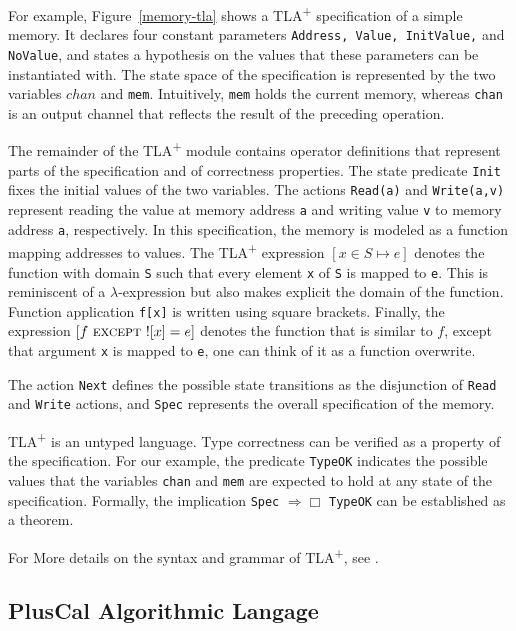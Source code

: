 \documentclass[journal]{IEEEtran}
\newcommand{\tlaplus}{TLA\textsuperscript{+}\xspace}
\newcommand{\EXCEPT}{\textsc{except}}
\begin{document}
For example, Figure~\ref{memory-tla} shows a \tlaplus specification of a simple memory. It declares four constant parameters \verb|Address, Value, InitValue,| and \verb|NoValue|, and states a hypothesis on the values that these parameters can be instantiated with. The state space of the specification is represented by the two variables $chan$ and \verb|mem|. Intuitively, \verb|mem| holds the current memory, whereas \verb|chan| is an output channel that reflects the result of the preceding operation.

The remainder of the \tlaplus module contains operator definitions that represent parts of the specification and of correctness properties. The state predicate \verb|Init| fixes the initial values of the two variables. The actions \verb|Read(a)| and \verb|Write(a,v)| represent reading the value at memory address \verb|a| and writing value \verb|v| to memory address \verb|a|, respectively. In this specification, the memory is modeled as a function mapping addresses to values. The \tlaplus expression $[x \in S \mapsto e]$ denotes the function with domain \verb|S| such that every element \verb|x| of \verb|S| is mapped to \verb|e|. This is reminiscent of a $\lambda$-expression but also makes explicit the domain of the function. Function application \verb|f[x]| is written using square brackets. Finally, the expression $[f\ \EXCEPT\ ![x] = e]$ denotes the function that is similar to $f$, except that argument \verb|x| is mapped to \verb|e|, one can think of it as a function overwrite.

The action \verb|Next| defines the possible state transitions as the disjunction of \verb|Read| and \verb|Write| actions, and \verb|Spec| represents the overall specification of the memory.

\tlaplus is an untyped language. Type correctness can be verified as a property of the specification. For our example, the predicate \verb|TypeOK| indicates the possible values that the variables \verb|chan| and \verb|mem| are expected to hold at any state of the specification. Formally, the implication \verb|Spec| $\Rightarrow \Box$ \verb|TypeOK| can be established as a theorem.

\bigskip


For More details on the syntax and grammar of \tlaplus, see \cite{tlabook} \cite{tlaplus}.

\subsection{PlusCal Algorithmic Langage}
\end{document}
